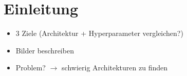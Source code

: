 
\chapter{Einleitung}
\begin{itemize}
	\item 3 Ziele (Architektur + Hyperparameter vergleichen?)
	\item Bilder beschreiben
	\item Problem? $\rightarrow$ schwierig Architekturen zu finden
\end{itemize}

